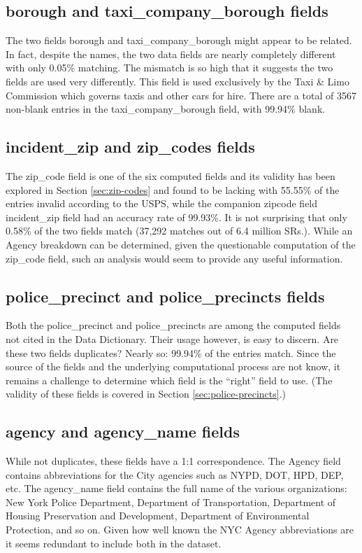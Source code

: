 \documentclass[12pt, titlepage]{article}
\begin{document}
{\subsection{borough and taxi\_company\_borough fields}
The two fields borough and taxi\_company\_borough might appear to be related. In fact, despite the names, 
the two data fields are nearly completely different with only 0.05\% matching. The mismatch is so
high that it suggests the two fields are used very differently.  This field is used exclusively by the 
Taxi \& Limo Commission which governs taxis and other cars for hire.
There are a total of 3567 non-blank entries in the taxi\_company\_borough field, with 99.94\% blank.

 \subsection{incident\_zip and zip\_codes fields}
 The zip\_code field is one of the six computed fields and its validity has been explored in Section \ref{sec:zip-codes} and
 found to be lacking with 55.55\% of the entries invalid according to the USPS, while the companion zipcode
 field incident\_zip field had an accuracy rate of 99.93\%. It is not surprising that 
 only 0.58\% of the two fields match (37,292 matches out of 6.4 million SRs.). While an Agency breakdown can be
 determined, given the questionable computation of the zip\_code field, such an analysis would
 seem to provide any useful information.  

 \subsection{police\_precinct and police\_precincts fields}  
Both the police\_precinct and police\_precincts are among the computed fields not cited in the Data Dictionary. Their usage however, is easy to discern. Are these two fields duplicates? Nearly so:  99.94\% of the entries match. Since the source of the fields and the underlying computational process are not know, it remains a challenge to determine which field is
the ``right'' field to use. (The validity of these fields is covered in Section \ref{sec:police-precincts}.)

 \subsection{agency and agency\_name fields}
 While not duplicates, these fields have a 1:1 correspondence.  The Agency field contains abbreviations for the City agencies such as NYPD, DOT, HPD, DEP, etc.
 The agency\_name field contains the full name of the various organizations: New York Police Department, Department of Transportation, Department
 of Housing Preservation and Development, Department of Environmental Protection, and so on.  Given how well known the NYC Agency abbreviations are
it seems redundant to include both in the dataset.

}
\end{document}
